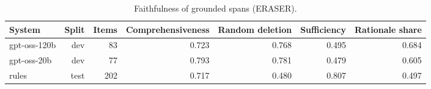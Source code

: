 \begin{table}[t]
\centering\small
\caption{Faithfulness of grounded spans (ERASER).}
\label{tab:faithfulness}
\begin{tabular}{lrrrrrr}
\toprule
System & Split & Items & Comprehensiveness & Random deletion & Sufficiency & Rationale share \\
\midrule
gpt-oss-120b & dev & 83 & 0.723 & 0.768 & 0.495 & 0.684 \\
gpt-oss-20b & dev & 77 & 0.793 & 0.781 & 0.479 & 0.605 \\
rules & test & 202 & 0.717 & 0.480 & 0.807 & 0.497 \\
\bottomrule
\end{tabular}
\end{table}

